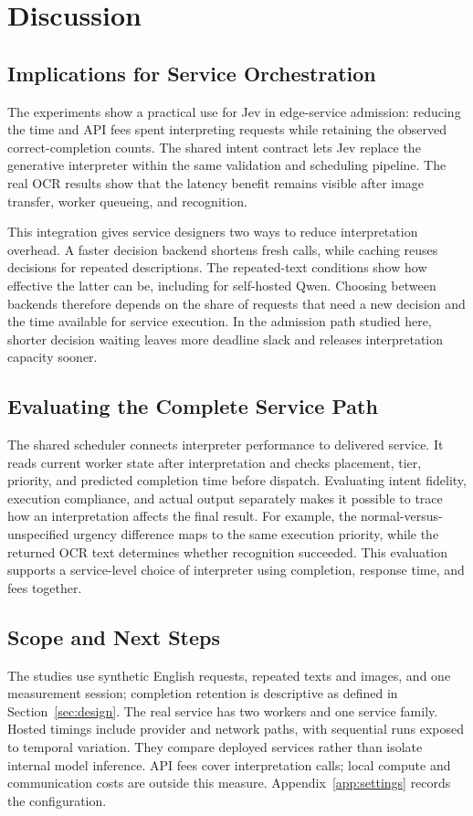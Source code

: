 \section{Discussion}
\subsection{Implications for Service Orchestration}
The experiments show a practical use for Jev in edge-service admission:
reducing the time and API fees spent interpreting requests while retaining
the observed correct-completion counts. The shared intent contract lets
Jev replace the generative interpreter within the same validation and
scheduling pipeline. The real OCR results show that the latency benefit
remains visible after image transfer, worker queueing, and recognition.

This integration gives service designers two ways to reduce interpretation
overhead. A faster decision backend shortens fresh calls, while caching
reuses decisions for repeated descriptions. The repeated-text conditions
show how effective the latter can be, including for self-hosted Qwen.
Choosing between backends therefore depends on the share of requests that
need a new decision and the time available for service execution. In the
admission path studied here, shorter decision waiting leaves more deadline
slack and releases interpretation capacity sooner.

\subsection{Evaluating the Complete Service Path}
The shared scheduler connects interpreter performance to delivered service.
It reads current worker state after interpretation and checks placement,
tier, priority, and predicted completion time before dispatch. Evaluating
intent fidelity, execution compliance, and actual output separately makes
it possible to trace how an interpretation affects the final result.
For example, the normal-versus-unspecified urgency difference maps to the
same execution priority, while the returned OCR text determines whether
recognition succeeded. This evaluation supports a service-level choice of
interpreter using completion, response time, and fees together.

\subsection{Scope and Next Steps}
The studies use synthetic English requests, repeated texts and images, and
one measurement session; completion retention is descriptive as defined in
Section~\ref{sec:design}. The real service has two workers and one service
family. Hosted timings include provider and network paths, with sequential
runs exposed to temporal variation. They compare deployed services rather
than isolate internal model inference. API fees cover interpretation calls;
local compute and communication costs are outside this measure.
Appendix~\ref{app:settings} records the configuration.

